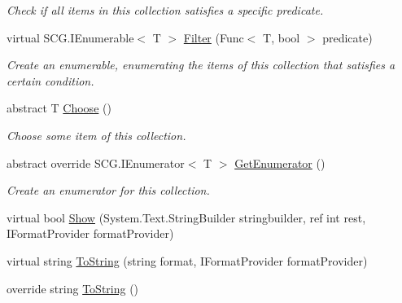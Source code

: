 \begin{DoxyCompactItemize}
\begin{DoxyCompactList}\small\item\em Check if all items in this collection satisfies a specific predicate. \end{DoxyCompactList}\item 
virtual S\+C\+G.\+I\+Enumerable$<$ T $>$ \hyperlink{class_c5_1_1_collection_value_base_a1e67c05020e8bebf39e0ddc9f55e5f32}{Filter} (Func$<$ T, bool $>$ predicate)
\begin{DoxyCompactList}\small\item\em Create an enumerable, enumerating the items of this collection that satisfies a certain condition. \end{DoxyCompactList}\item 
abstract T \hyperlink{class_c5_1_1_collection_value_base_ad7b8bd01dfd7ea8480a972f02a81608b}{Choose} ()
\begin{DoxyCompactList}\small\item\em Choose some item of this collection. \end{DoxyCompactList}\item 
abstract override S\+C\+G.\+I\+Enumerator$<$ T $>$ \hyperlink{class_c5_1_1_collection_value_base_a0e8b891322ed9987a18f1a1ac87d2d4f}{Get\+Enumerator} ()
\begin{DoxyCompactList}\small\item\em Create an enumerator for this collection. \end{DoxyCompactList}\item 
virtual bool \hyperlink{class_c5_1_1_collection_value_base_a96bd5814c13153aefae15ba969311c24}{Show} (System.\+Text.\+String\+Builder stringbuilder, ref int rest, I\+Format\+Provider format\+Provider)
\item 
virtual string \hyperlink{class_c5_1_1_collection_value_base_ad27cc9a47ff634613af0b5f0929de046}{To\+String} (string format, I\+Format\+Provider format\+Provider)
\item 
override string \hyperlink{class_c5_1_1_collection_value_base_a1fd928b586eb8af9378542d77e4de365}{To\+String} ()
\end{DoxyCompactItemize}
